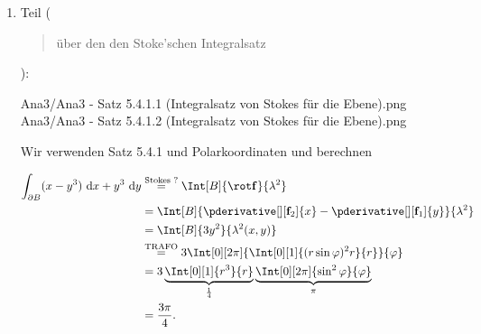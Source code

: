 \begin{solution}
\begin{enumerate}[label = \arabic*.]
    \item Teil (\blockquote{über den den Stoke'schen Integralsatz}):
    
    {Ana3/Ana3 - Satz 5.4.1.1 (Integralsatz von Stokes für die Ebene).png}
    {Ana3/Ana3 - Satz 5.4.1.2 (Integralsatz von Stokes für die Ebene).png}

    Wir verwenden Satz 5.4.1 und Polarkoordinaten und berechnen

    \begin{align*}
        \int_{\partial B}
                (x - y^3)
                ~\mathrm d x
            +
            y^3
            ~\mathrm d y
        & \stackrel
        {
            \text{Stokes ?}
        }{=}
        \Int[B]
        {
            \rot \mathbf f
        }{\lambda^2} \\
        & =
        \Int[B]
        {
            \pderivative[][\mathbf f_2]{x}
            -
            \pderivative[][\mathbf f_1]{y}
        }{\lambda^2} \\
        & =
        \Int[B]
        {
            3 y^2
        }{\lambda^2(x, y)} \\
        & \stackrel
        {
            \text{TRAFO}
        }{=}
        3
        \Int[0][2 \pi]
        {
            \Int[0][1]
            {
                (r \sin \varphi)^2 r
            }{r}
        }{\varphi} \\
        & =
        3
        \underbrace
        {
            \Int[0][1]
            {
                r^3
            }{r}
        }_\frac{1}{4}
        \underbrace
        {
            \Int[0][2 \pi]
            {
                \sin^2 \varphi
            }{\varphi}
        }_\pi \\
        & =
        \frac{3 \pi}{4}.
    \end{align*}

\end{enumerate}

\end{solution}

